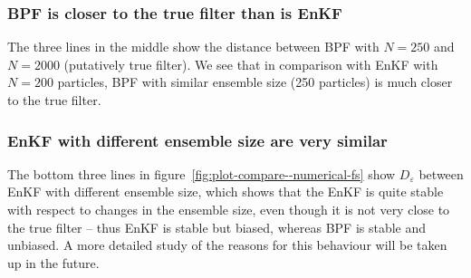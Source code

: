 \subsubsection{BPF is closer to the true filter than is EnKF} The three lines in the middle show the distance between BPF with $N=250$ and $N=2000$ (putatively true filter). We see that in comparison with EnKF with $N=200$ particles, BPF with similar ensemble size (250 particles) is much closer to the true filter.
\subsubsection{EnKF with different ensemble size are very similar} The bottom three lines in figure~\ref{fig:plot-compare--numerical-fs} show $D_\varepsilon$ between EnKF with different ensemble size, which shows that the EnKF is quite stable with respect to changes in the ensemble size, even though it is not very close to the true filter -- thus EnKF is stable but biased, whereas BPF is stable and unbiased. A more detailed study of the reasons for this behaviour will be taken up in the future.


